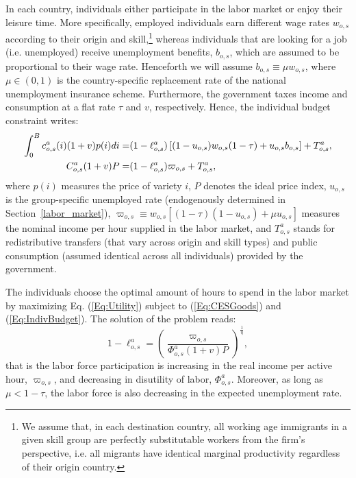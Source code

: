 \documentclass[a4paper,12pt]{article}
\begin{document}
In each country, individuals either participate in the labor market or enjoy
their leisure time. More specifically, employed individuals earn different
wage rates $w_{o,s}$ according to their origin and skill,\footnote{%
We assume that, in each destination country, all working age immigrants in a
given skill group are perfectly substitutable workers from the firm's
perspective, i.e. all migrants have identical marginal productivity
regardless of their origin country.} whereas individuals that are looking
for a job (i.e. unemployed) receive unemployment benefits, $b_{o,s}$, which
are assumed to be proportional to their wage rate. Henceforth we will assume 
$b_{o,s}\equiv \mu w_{o,s}$, where $\mu \in (0,1)$ is the country-specific
replacement rate of the national unemployment insurance scheme. Furthermore,
the government taxes income and consumption at a flat rate $\tau $ and $v$,
respectively. Hence, the individual budget constraint writes: 
\begin{align}
\int_{0}^{B}c_{o,s}^{a}(i)(1+v)p(i)di=& (1-\ell _{o,s}^{a})\left[
(1-u_{o,s})w_{o,s}(1-\tau )+u_{o,s}b_{o,s}\right] +T_{o,s}^{a},  \notag \\
C_{o,s}^{a}(1+v)P=& (1-\ell _{o,s}^{a})\varpi _{o,s}+T_{o,s}^{a},
\label{Eq:IndivBudget}
\end{align}
\sloppy where $p(i)$ measures the price of variety $i$, $P$ denotes the ideal price
index, $u_{o,s}$ is the group-specific unemployed rate (endogenously
determined in Section~\ref{labor_market}), $\varpi _{o,s}\equiv w_{o,s}\left[ (1-\tau
)(1-u_{o,s})+\mu u_{o,s}\right]$ measures the nominal income per hour
supplied in the labor market, and $T_{o,s}^{a}$ stands for redistributive
transfers (that vary across origin and skill types) and public consumption
(assumed identical across all individuals) provided by the government.

The individuals choose the optimal amount of hours to spend in the labor
market by maximizing Eq. (\ref{Eq:Utility}) subject to (\ref{Eq:CESGoods})
and (\ref{Eq:IndivBudget}). The solution of the problem reads: 
\begin{equation}
1-\ell _{o,s}^{a}=\left( \frac{\varpi _{o,s}}{\Phi _{o,s}^{a}(1+v)P}\right)
^{\frac{1}{\eta }},  \label{Eq:labSupply}
\end{equation}%
that is the labor force participation is increasing in the real income per
active hour, $\varpi _{o,s}$, and decreasing in disutility of labor, $\Phi^a_{o,s}$. Moreover, as long as $\mu <1-\tau $, the labor force is also
decreasing in the expected unemployment rate.
\end{document}

